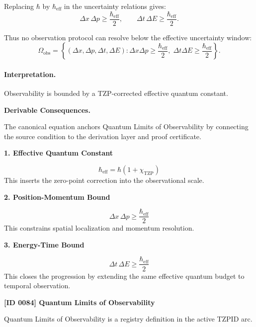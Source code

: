 Replacing $\hbar$ by $\hbar_{\mathrm{eff}}$ in the uncertainty relations gives:
\begin{equation}
\Delta x\,\Delta p
\geq
\frac{\hbar_{\mathrm{eff}}}{2},
\qquad
\Delta t\,\Delta E
\geq
\frac{\hbar_{\mathrm{eff}}}{2}.
\end{equation}

Thus no observation protocol can resolve below the effective uncertainty window:
\begin{equation}
\boxed{
\Omega_{\mathrm{obs}}
=
\left\{
(\Delta x,\Delta p,\Delta t,\Delta E):
\Delta x\Delta p\geq \frac{\hbar_{\mathrm{eff}}}{2},
\;
\Delta t\Delta E\geq \frac{\hbar_{\mathrm{eff}}}{2}
\right\}.
}
\end{equation}

\paragraph{Interpretation.}
Observability is bounded by a TZP-corrected effective quantum constant.

\par\vspace{0.35em}
\noindent\textbf{Derivable Consequences.}\quad
\begingroup
\footnotesize
\raggedright
The canonical equation anchors Quantum Limits of Observability by connecting the source condition to the derivation layer and proof certificate.
\par\endgroup

\noindent\textbf{1. Effective Quantum Constant}\par
\[
\hbar_{\mathrm{eff}}=\hbar\left(1+\chi_{\mathrm{TZP}}\right)
\]
\noindent This inserts the zero-point correction into the observational scale.\par
\noindent\textbf{2. Position-Momentum Bound}\par
\[
\Delta x\,\Delta p \ge \frac{\hbar_{\mathrm{eff}}}{2}
\]
\noindent This constrains spatial localization and momentum resolution.\par
\noindent\textbf{3. Energy-Time Bound}\par
\[
\Delta t\,\Delta E \ge \frac{\hbar_{\mathrm{eff}}}{2}
\]
\noindent This closes the progression by extending the same effective quantum budget to temporal observation.\par

\clearpage
\noindent\textbf{[ID 0084] Quantum Limits of Observability}\par
\vspace{0.35em}
\begingroup\small
{}
Quantum Limits of Observability is a registry definition in the active TZPID arc.

